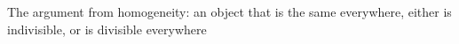 \documentclass[preview]{standalone}
\begin{document}
\begin{center}
The argument from homogeneity: an object that is the same everywhere, either is indivisible, or is divisible everywhere
\end{center}
\end{document}
